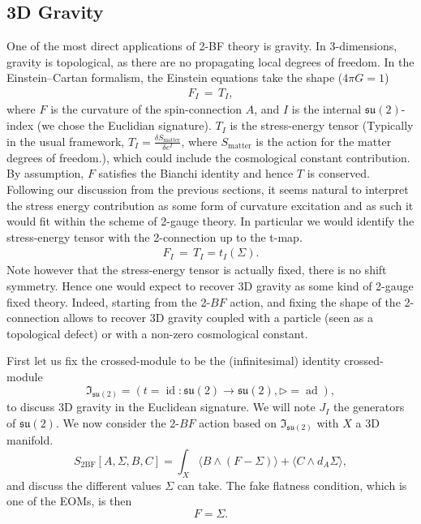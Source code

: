 \documentclass[onecolumn]{article}
\theoremstyle{theorem}
\theoremstyle{remark}
\theoremstyle{example}
\theoremstyle{definition}
\numberwithin{equation}{section}
\newcommand{\beq}{\begin{eqnarray}}
\newcommand{\eeq}{\end{eqnarray}}
\begin{document}
\subsection{3D Gravity}\label{3Dgrav}
One of the most direct applications of 2-BF theory is gravity. In 3-dimensions, gravity is topological, as there are no propagating local degrees of freedom.  In the Einstein--Cartan formalism,  the Einstein equations take the shape \cite{Yepez:2011,Zanelli:2005} ($4\pi G=1$)
\beq
F_{I}\, =  \, T_{I},
\eeq
where $F$ is the curvature of the spin-connection $A$, and $I$ is the internal $\mathfrak{su}(2)$-index (we chose the Euclidian signature). $T_{I}$ is the stress-energy tensor {(Typically in the usual framework, $T_{I}=\frac{\delta {S}_\text{matter}}{\delta e^I}$, where ${S}_\text{matter}$ is the action for the matter degrees of freedom.)}, which could include the cosmological constant contribution. By assumption, $F$ satisfies the Bianchi identity and hence $T$ is conserved. Following our discussion from the previous sections, it seems natural to interpret the stress energy contribution as some form of curvature excitation and as such it would fit within the scheme of 2-gauge theory. In particular we would identify the stress-energy tensor with the 2-connection up to the t-map. 
\beq
F_{I}\, =  \, T_{I} = t_{I}(\Sigma).
\eeq
{Note} however that the stress-energy tensor is actually fixed, there is no shift symmetry. Hence one would expect to recover 3D gravity as some kind of 2-gauge fixed theory. Indeed, starting from the 2-$BF$ action, and fixing the shape of the 2-connection allows to recover 3D gravity coupled with a particle (seen as a topological defect) or with a non-zero cosmological constant. 



First let us fix the crossed-module to be the (infinitesimal) identity crossed-module 
$$\mathfrak{I}_{\mathfrak{su}(2)}=(t=\operatorname{id}:\mathfrak{su}(2)\rightarrow \mathfrak{su}(2),\rhd = \operatorname{ad}),$$
to discuss 3D gravity in the Euclidean signature. We will note $J_I$ the generators of $\mathfrak{su}(2)$.  We now consider the 2-$BF$ action based on $\mathfrak{I}_{\mathfrak{su}(2)}$ with $X$ a 3D manifold.
\begin{equation}
    S_\text{2BF}[A,\Sigma, B,C] = \int_X \langle B \wedge(F-\Sigma)\rangle + \langle C\wedge d_A \Sigma\rangle,\label{3d2bf-lambda1}
\end{equation}
and discuss the different values $\Sigma$ can take. The fake flatness condition, which is one of the EOMs,  is then 
\begin{equation} \label{fake-eins}
F=\Sigma.
\end{equation}
\end{document}
